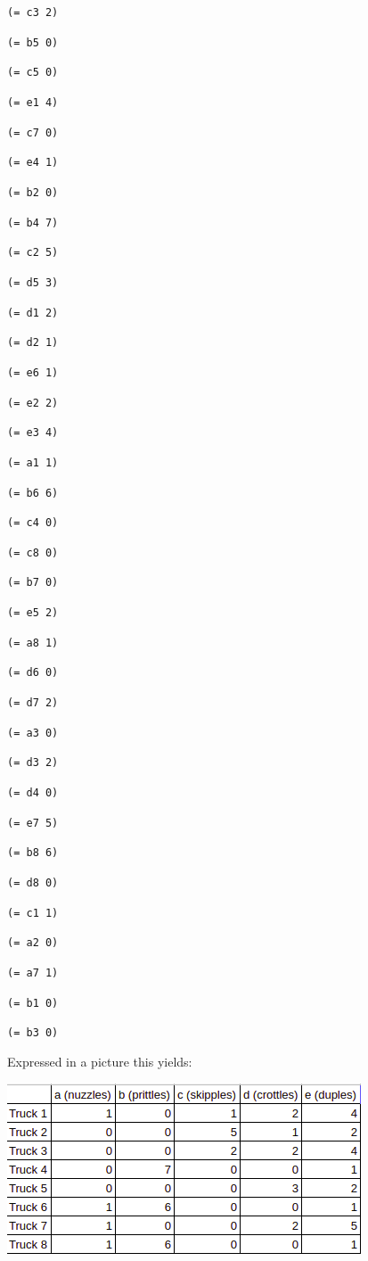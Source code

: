 \documentclass[12pt]{article}
\begin{document}
{\tt (= c3 2) }

{\tt (= b5 0) }

{\tt (= c5 0) }

{\tt (= e1 4) }

{\tt (= c7 0) }

{\tt (= e4 1) }

{\tt (= b2 0) }

{\tt (= b4 7) }

{\tt (= c2 5) }

{\tt (= d5 3) }

{\tt (= d1 2) }

{\tt (= d2 1) }

{\tt (= e6 1) }

{\tt (= e2 2) }

{\tt (= e3 4) }

{\tt (= a1 1) }

{\tt (= b6 6) }

{\tt (= c4 0) }

{\tt (= c8 0) }

{\tt (= b7 0) }

{\tt (= e5 2) }

{\tt (= a8 1) }

{\tt (= d6 0) }

{\tt (= d7 2) }

{\tt (= a3 0) }

{\tt (= d3 2) }

{\tt (= d4 0) }

{\tt (= e7 5) }

{\tt (= b8 6) }

{\tt (= d8 0) }

{\tt (= c1 1) }

{\tt (= a2 0) }

{\tt (= a7 1) }

{\tt (= b1 0) }

{\tt (= b3 0) }

{\tt  }

Expressed in a picture this yields: 

\includegraphics[scale=0.75, angle=0]{img/1b.png}
\end{document}
